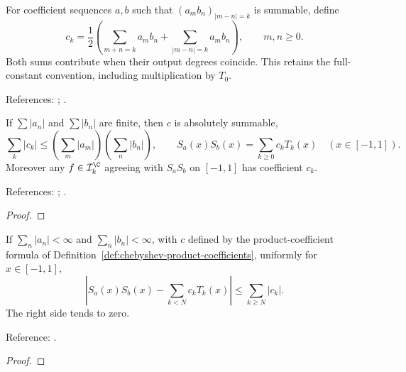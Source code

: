 \begin{definition}
\label{def:chebyshev-product-coefficients}
\leanok
For coefficient sequences $a,b$ such that $(a_mb_n)_{|m-n|=k}$ is summable, define
\[
 c_k=\frac12\left(\sum_{m+n=k}a_mb_n+
                         \sum_{|m-n|=k}a_mb_n\right),\qquad m,n\ge0.
\]
Both sums contribute when their output degrees coincide. This retains the
full-constant convention, including multiplication by $T_0$.

References: \cite[18.18.21]{dlmf}; \cite[Section 2.2, equation (2.7)]{olver-townsend}.
\end{definition}

\begin{theorem}
\label{thm:chebyshev-series-product}
\leanok
If $\sum|a_n|$ and $\sum|b_n|$ are finite, then $c$ is absolutely summable,
\[
 \sum_k|c_k|\le\left(\sum_m|a_m|\right)\left(\sum_n|b_n|\right),
 \qquad S_a(x)S_b(x)=\sum_{k\ge0}c_kT_k(x)\quad(x\in[-1,1]).
\]
Moreover any $f\in\mathcal I_k^{\C}$ agreeing with
$S_aS_b$ on $[-1,1]$ has coefficient $c_k$.

References: \cite[18.18.21]{dlmf}; \cite[Section 2.2]{olver-townsend}.
\end{theorem}
\begin{proof}
\leanok
\end{proof}

\begin{theorem}
\label{thm:chebyshev-series-product-error}
\leanok
If $\sum_n|a_n|<\infty$ and $\sum_n|b_n|<\infty$, with $c$ defined by the product-coefficient formula of Definition~\ref{def:chebyshev-product-coefficients}, uniformly for
$x\in[-1,1]$,
\[
 \left|S_a(x)S_b(x)-\sum_{k<N}c_kT_k(x)\right|\le\sum_{k\ge N}|c_k|.
\]
The right side tends to zero.

Reference: \cite[Chapter 3]{atap}.
\end{theorem}
\begin{proof}
\leanok
\end{proof}

